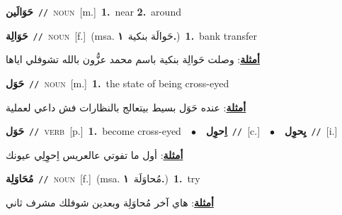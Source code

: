 \documentclass[10pt,a4paper,twoside]{article} %
\begin{document}
\begin{multicols}{2}
{\setlength\topsep{0pt}\textbf{\foreignlanguage{arabic}{حَوَالَين}}\ {\color{gray}\texttt{//}\color{black}}\ \textsc{noun}\ [m.]\ \textbf{1.}~near  \textbf{2.}~around\ } \vspace{2mm}

{\setlength\topsep{0pt}\textbf{\foreignlanguage{arabic}{حَوَالِة}}\ {\color{gray}\texttt{//}\color{black}}\ \textsc{noun}\ [f.]\ \color{gray}(msa. \foreignlanguage{arabic}{حَوالَة بنكية}~\foreignlanguage{arabic}{\textbf{١.}})\color{black}\ \textbf{1.}~bank transfer\  \begin{flushright}\color{gray}\foreignlanguage{arabic}{\textbf{\underline{\foreignlanguage{arabic}{أمثلة}}}: وصلت حَوالِة بنكية باسم محمد عزُّون بالله تشوفلي اياها}\end{flushright}\color{black}} \vspace{2mm}

{\setlength\topsep{0pt}\textbf{\foreignlanguage{arabic}{حَوَل}}\ {\color{gray}\texttt{//}\color{black}}\ \textsc{noun}\ [m.]\ \textbf{1.}~the state of being cross-eyed\  \begin{flushright}\color{gray}\foreignlanguage{arabic}{\textbf{\underline{\foreignlanguage{arabic}{أمثلة}}}: عنده حَوَل بسيط بيتعالج بالنظارات فش داعي لعملية}\end{flushright}\color{black}} \vspace{2mm}

{\setlength\topsep{0pt}\textbf{\foreignlanguage{arabic}{حَوَل}}\ {\color{gray}\texttt{//}\color{black}}\ \textsc{verb}\ [p.]\ \textbf{1.}~become cross-eyed\ \ $\bullet$\ \ \setlength\topsep{0pt}\textbf{\foreignlanguage{arabic}{اِحوِل}}\ {\color{gray}\texttt{//}\color{black}}\ [c.]\ \ $\bullet$\ \ \setlength\topsep{0pt}\textbf{\foreignlanguage{arabic}{يِحوِل}}\ {\color{gray}\texttt{//}\color{black}}\ [i.]\  \begin{flushright}\color{gray}\foreignlanguage{arabic}{\textbf{\underline{\foreignlanguage{arabic}{أمثلة}}}: أول ما تفوتي عالعريس اِحوِلِي عيونك}\end{flushright}\color{black}} \vspace{2mm}

{\setlength\topsep{0pt}\textbf{\foreignlanguage{arabic}{مُحَاوَلِة}}\ {\color{gray}\texttt{//}\color{black}}\ \textsc{noun}\ [f.]\ \color{gray}(msa. \foreignlanguage{arabic}{مُحاوَلَة}~\foreignlanguage{arabic}{\textbf{١.}})\color{black}\ \textbf{1.}~try\  \begin{flushright}\color{gray}\foreignlanguage{arabic}{\textbf{\underline{\foreignlanguage{arabic}{أمثلة}}}: هاي آخر مُحاوَلِة وبعدين شوفلك مشرف ثاني}\end{flushright}\color{black}} \vspace{2mm}


\end{multicols}
\end{document}
